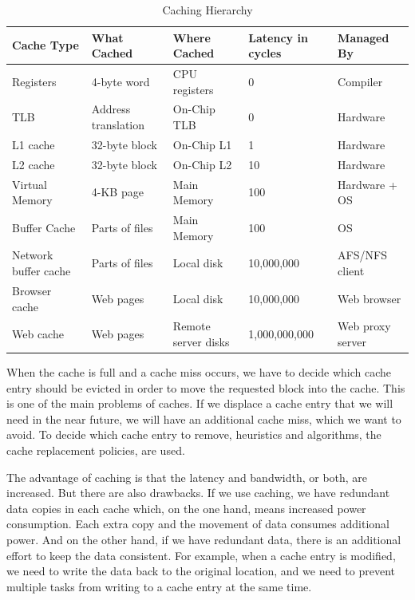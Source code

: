 \documentclass[
	12pt,
	a4paper,
	abstract,
	bibliography=totoc,
	chapterprefix,
	headings=openright,
	numbers=endperiod,
	parskip=half,
	twoside,
]{scrreprt}
\begin{document}
\begin{table}[ht]
	\centering
	\begin{tabular}{|p{3cm}|p{3cm}|p{3cm}|p{2cm}|p{3cm}|}
		\hline
		\textbf{Cache Type} & \textbf{What Cached} & \textbf{Where Cached} & \textbf{Latency in cycles} & \textbf{Managed By}\\
		\hline
		Registers & 4-byte word & CPU registers & 0 & Compiler \\
		\hline
		TLB & Address translation & On-Chip TLB & 0 & Hardware \\
		\hline
		L1 cache & 32-byte block & On-Chip L1 & 1 & Hardware \\
		\hline
		L2 cache & 32-byte block & On-Chip L2 & 10 & Hardware \\
		\hline
		Virtual Memory & 4-KB page & Main Memory & 100 & Hardware + OS \\
		\hline
		Buffer Cache & Parts of files & Main Memory & 100 & OS \\
		\hline
		Network buffer cache & Parts of files & Local disk & 10,000,000 & AFS/NFS client \\
		\hline
		Browser cache & Web pages & Local disk & 10,000,000 & Web browser \\
		\hline
		Web cache & Web pages & Remote server disks & 1,000,000,000 & Web proxy server \\
		\hline
	\end{tabular}
	\caption{Caching Hierarchy \cite{7569243}}
	\label{tab:caching hierarchy}
\end{table}

When the cache is full and a cache miss occurs, we have to decide which cache entry should be 
evicted in order to move the requested block into the cache.
This is one of the main problems of caches. If we displace a cache entry that we will need in the near future, 
we will have an additional cache miss, which we want to avoid.
To decide which cache entry to remove, heuristics and algorithms, the cache replacement policies, are used.

The advantage of caching is that the latency and bandwidth, or both, are increased.
But there are also drawbacks.
If we use caching, we have redundant data copies in each cache which, on the one hand, means increased power consumption.
Each extra copy and the movement of data consumes additional power.
And on the other hand, if we have redundant data, there is an additional effort to keep the data consistent.
For example, when a cache entry is modified, we need to write the data back to the original location, 
and we need to prevent multiple tasks from writing to a cache entry at the same time.
\end{document}
